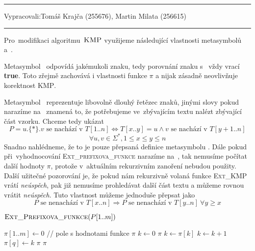 \documentclass[12pt]{article}
\newcommand{\la}{\leftarrow}
\newcommand{\zadani}[2]{
{\large
\noindent {\bf IB108 \hfill{} Sada #1, Příklad #2 \\[-4mm]}
\noindent\hrule
\vspace{2mm}
\noindent Vypracovali:\hfill{}Tomáš Krajča (255676), Martin Milata (256615)
\vspace{3mm}
\hrule
\bigskip\bigskip}
}
\begin{document}
\zadani{3}{1}
\noindent
Pro~modifikaci algoritmu~$\textsc{KMP}$ využijeme následující vlastnosti
metasymbolů~ a~\uv{*}. 

\noindent
Metasymbol~ odpovídá jakémukoli znaku, tedy
porovnání znaku s~ vždy vrací \textbf{true}. Toto zřejmě zachovává i
vlastnosti
funkce $\pi$ a nijak zásadně neovlivňuje korektnost \textsc{KMP}.

\noindent
Metasymbol~\uv{*} reprezentuje
libovolně dlouhý řetězec znaků, jinými slovy pokud narazíme na~\uv{*} znamená to, že
potřebujeme ve~zbývajícím textu nalézt zbývající část vzorku. Chceme tedy ukázat
$$ P = u.\{*\}.v \text{ se nachází v } T[1..n] \Leftrightarrow T[x..y] = u \wedge
v \text{ se nachází v } T[y+1..n] $$ $$\forall u,v \in \Sigma^*, 1 \leq x \leq y \leq
n$$
Snadno nahlédneme, že to je pouze přepsaná definice metasymbolu \uv{*}. 
Dále
pokud při~vyhodnocování \textsc{Ext\_prefixova\_funkce} narazíme na~\uv{*}, tak
nemusíme počítat další hodnoty $\pi$, protože v~aktuálním rekurzivním zanoření
nebudou použity.
Další užitečné pozorování je, že pokud nám rekurzivně volaná funkce \textsc{Ext\_KMP} vrátí \textit{neúspěch}, pak již nemusíme prohledávat další část textu a můžeme rovnou vrátit \textit{neúspěch}. Tuto vlastnost můžeme jednoduše přepsat jako $$P \text{ se nenachází v } T[x..n] \Rightarrow P \text{ se nenachází v } T[y..n]~\forall y
\geq x$$

\begin{algorithm}
$\textsc{Ext\_Prefixova\_funkce}(P[1..m])$
\begin{algorithmic}[1]
\STATE $\pi[1..m] \la 0$ // pole s hodnotami funkce $\pi$
\STATE $k \la 0$
\RETURN $\pi$
\ENDIF
\FOR {$q \la 2 \mbox{ to } m$}
\STATE $k \la \pi[k]$
\ENDWHILE
{} \STATE $k \la k+1$ \ENDIF
\STATE $\pi[q] \la k$
\ELSE
\RETURN $\pi$
\ENDIF
\ENDFOR
\RETURN $\pi$
\end{algorithmic}
\end{algorithm}
\end{document}
